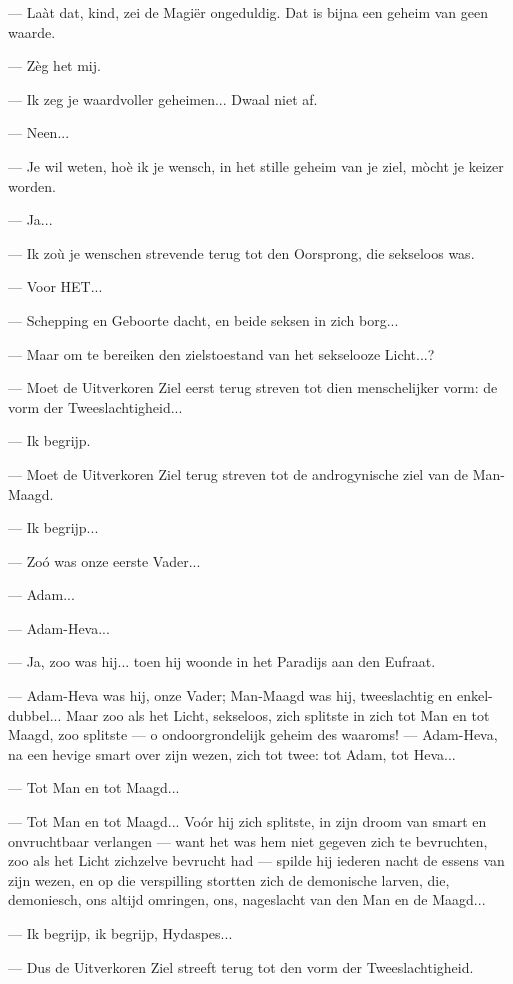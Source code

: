 \documentclass[a4paper, 12pt, oneside, dutch]{article}
\begin{document}
--- Laàt dat, kind, zei de Magiër ongeduldig. Dat is bijna een geheim van geen waarde.

--- Zèg het mij.

--- Ik zeg je waardvoller geheimen... Dwaal niet af.

--- Neen...

--- Je wil weten, hoè ik je wensch, in het stille geheim van je ziel, mòcht je keizer worden.

--- Ja...

--- Ik zoù je wenschen strevende terug tot den Oorsprong, die sekseloos was.

--- Voor HET...

--- Schepping en Geboorte dacht, en beide seksen in zich borg...

--- Maar om te bereiken den zielstoestand van het sekselooze Licht...?

--- Moet de Uitverkoren Ziel eerst terug streven tot dien menschelijker vorm: de vorm der Tweeslachtigheid...

--- Ik begrijp.

--- Moet de Uitverkoren Ziel terug streven tot de androgynische ziel van de Man-Maagd.

--- Ik begrijp...

--- Zoó was onze eerste Vader...

--- Adam...

--- Adam-Heva...

--- Ja, zoo was hij... toen hij woonde in het Paradijs aan den Eufraat.

--- Adam-Heva was hij, onze Vader; Man-Maagd was hij, tweeslachtig en enkel-dubbel... Maar zoo als het Licht, sekseloos, zich splitste in zich tot Man en tot Maagd, zoo splitste --- o ondoorgrondelijk geheim des waaroms! --- Adam-Heva, na een hevige smart over zijn wezen, zich tot twee: tot Adam, tot Heva...

--- Tot Man en tot Maagd...

--- Tot Man en tot Maagd... Voór hij zich splitste, in zijn droom van smart en onvruchtbaar verlangen --- want het was hem niet gegeven zich te bevruchten, zoo als het Licht zichzelve bevrucht had --- spilde hij iederen nacht de essens van zijn wezen, en op die verspilling stortten zich de demonische larven, die, demoniesch, ons altijd omringen, ons, nageslacht van den Man en de Maagd...

--- Ik begrijp, ik begrijp, Hydaspes...

--- Dus de Uitverkoren Ziel streeft terug tot den vorm der Tweeslachtigheid.
\end{document}

